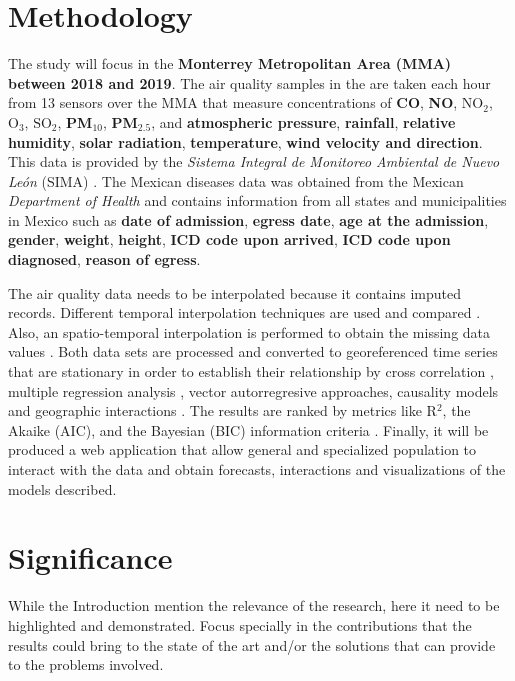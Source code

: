\documentclass[
  11pt,
  a4paper,
  oneside
]{article}
\begin{document}
\section{Methodology}
The study will focus in the \textbf{Monterrey Metropolitan Area (MMA) between 2018 and 2019}. The air quality samples in the are taken each hour from 13 sensors over the MMA that measure concentrations of \textbf{CO}, \textbf{NO}, \textbf{$\text{NO}_2$}, \textbf{$\text{O}_3$}, \textbf{$\text{SO}_2$}, \textbf{PM$_{10}$}, \textbf{PM$_{2.5}$}, and \textbf{atmospheric pressure}, \textbf{rainfall}, \textbf{relative humidity}, \textbf{solar radiation}, \textbf{temperature}, \textbf{wind velocity and direction}. This data is provided by the \textit{Sistema Integral de Monitoreo Ambiental de Nuevo León} (SIMA) \citep{aireNL}. The Mexican diseases data was obtained from the Mexican \textit{Department of Health} \citep{egresos} and contains information from all states and municipalities in Mexico such as \textbf{date of admission}, \textbf{egress date}, \textbf{age at the admission}, \textbf{gender}, \textbf{weight}, \textbf{height}, \textbf{ICD code upon arrived}, \textbf{ICD code upon diagnosed}, \textbf{reason of egress}.

The air quality data needs to be interpolated because it contains imputed records. Different temporal interpolation techniques are used and compared \citep{Friedman1962}. Also, an spatio-temporal interpolation is performed to obtain the missing data values \citep{LiEA2002}. Both data sets are processed and converted to georeferenced time series \citep{Wei2019} that are stationary \citep{Hyndman2018} in order to establish their relationship by cross correlation \citep{derrickEA2004}, multiple regression analysis \citep{Brockwell2002}, vector autorregresive approaches, causality models \citep{popescuEA2013} and geographic interactions \citep{ComberEA2019}. The results are ranked by metrics like R$^2$, the Akaike (AIC), and the Bayesian (BIC) information criteria \citep{Albert2007}. Finally, it will be produced a web application that allow general and specialized population to interact with the data and obtain forecasts, interactions and visualizations of the models described.

\section{Significance}
While the Introduction mention the relevance of the research, here it need to be highlighted and demonstrated. Focus specially in the contributions that the results could bring to the state of the art and/or the solutions that can provide to the problems involved.
\end{document}
